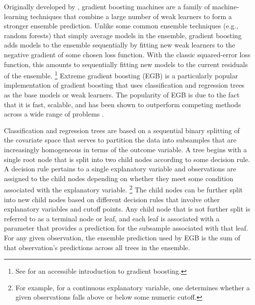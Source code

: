 \documentclass[english]{article}
\begin{document}
\doublespacing


Originally developed by \citet{friedman2001greedy}, gradient boosting machines are a family of 
machine-learning techniques that combine a large number of weak learners to form 
a stronger ensemble prediction.
Unlike some common ensemble techniques (e.g., random forests) that simply average models
in the ensemble, gradient boosting adds models to the ensemble sequentially by fitting new
weak learners to the negative gradient of some chosen loss function.
With the classic squared-error loss function, this amounts to sequentially fitting new models to 
the current residuals of the ensemble.%
\footnote{See \citet{natekin2013gradient} for an accessible introduction to gradient boosting.}
Extreme gradient boosting (EGB) is a particularly popular implementation of gradient boosting
that uses classification and regression trees as the base models or weak learners.
The popularity of EGB is due to the fact that it is fast, scalable, and has been shown to outperform 
competing methods across a wide range of problems \citep{chen2016xgboost}.

Classification and regression trees are based on a sequential binary splitting of the covariate space that
serves to partition the data into subsamples that are increasingly homogeneous in terms of the outcome 
variable.
A tree begins with a single root node that is split into two child nodes according to some decision
rule.
A decision rule pertains to a single explanatory variable and observations are assigned to the 
child nodes depending on whether they meet some condition associated with the explanatory
variable.%
\footnote{For example, for a continuous explanatory variable, one determines whether a given
observations falls above or below some numeric cutoff.} 
The child nodes can be further split into new child nodes based on different decision rules that
involve other explanatory variables and cutoff points. 
Any child node that is not further split is referred to as a terminal node or leaf, and each leaf is
associated with a parameter that provides a prediction for the subsample associated
with that leaf.
For any given observation, the ensemble prediction used by EGB is the sum of that observation's
predictions across all trees in the ensemble.
\end{document}

